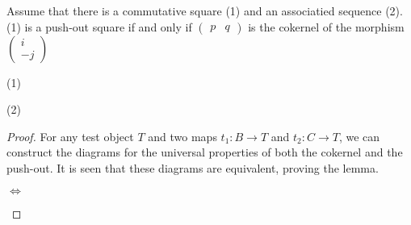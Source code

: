    \begin{lemma}
        Assume that there is a commutative square (1) and an associatied sequence (2). (1) is a push-out square if and only if $\begin{pmatrix}
            p & q
        \end{pmatrix}$ is the cokernel of the morphism $\begin{pmatrix}
            i \\ -j
        \end{pmatrix}$
        \begin{center}
            (1)
            \space (2)
        \end{center}
    \end{lemma}

    \begin{proof}
        For any test object $T$ and two maps $t_1:B\rightarrow T$ and $t_2:C\rightarrow T$, we can construct the diagrams for the universal properties of both the cokernel and the push-out. It is seen that these diagrams are equivalent, proving the lemma.
        \begin{center}
            $\Leftrightarrow$
        \end{center}
    \end{proof}

